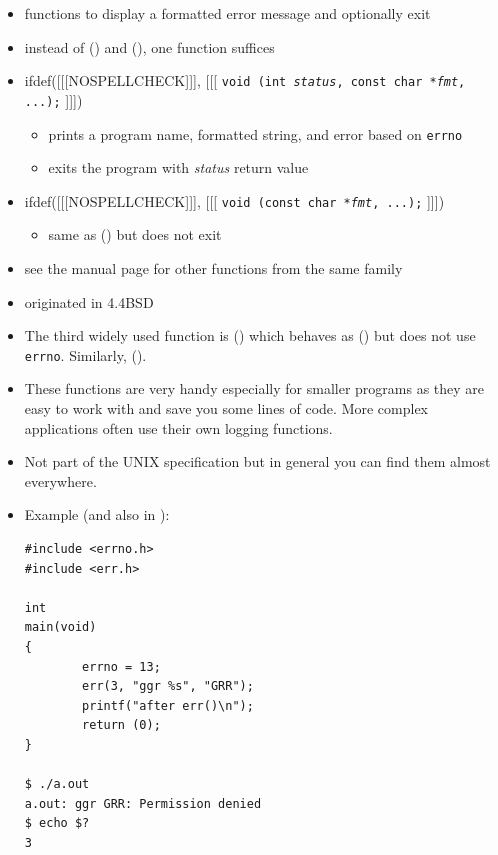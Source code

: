 \begin{slide}
\setlength{\baselineskip}{0.8\baselineskip}
\begin{itemize}
\item functions to display a formatted error message and optionally exit
\item instead of () and (), one function suffices
\item
ifdef([[[NOSPELLCHECK]]], [[[
\texttt{void (int \emph{status}, const char *\emph{fmt}, ...);}
]]])
\begin{itemize}
\item prints a program name, formatted string, and error based on
\texttt{errno}
\item exits the program with \emph{status} return value
\end{itemize}
\item
ifdef([[[NOSPELLCHECK]]], [[[
\texttt{void (const char *\emph{fmt}, ...);}
]]])
\begin{itemize}
\item same as () but does not exit
\end{itemize}
\item see the manual page for other functions from the same family
\item originated in 4.4BSD
\end{itemize}
\end{slide}


\begin{itemize}
\label{ERR}
\item The third widely used function is () which behaves as
() but does not use \texttt{errno}.  Similarly, ().
\item These functions are very handy especially for smaller programs as they are
easy to work with and save you some lines of code.  More complex
app\-li\-ca\-tions often use their own logging functions.
\item Not part of the UNIX specification but in general you can find them almost
everywhere.
\item Example (and also in ):

\begin{verbatim}
#include <errno.h>
#include <err.h>

int
main(void)
{
        errno = 13;
        err(3, "ggr %s", "GRR");
        printf("after err()\n");
        return (0);
}

$ ./a.out 
a.out: ggr GRR: Permission denied
$ echo $?
3
\end{verbatim}

\end{itemize}

\endinput
